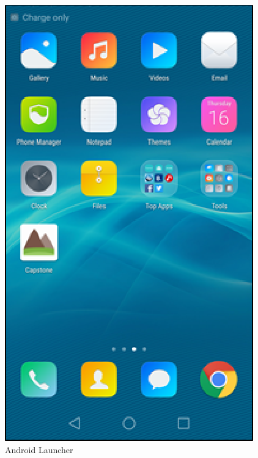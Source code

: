 \documentclass[letterpaper, 10pt,titlepage]{article}
\begin{document}
\begin{figure}[ht]
    \centering
    \includegraphics[scale=1.2]{android1}
    \caption{Android Launcher}
    \label{charles1}
\end{figure}
\end{document}
